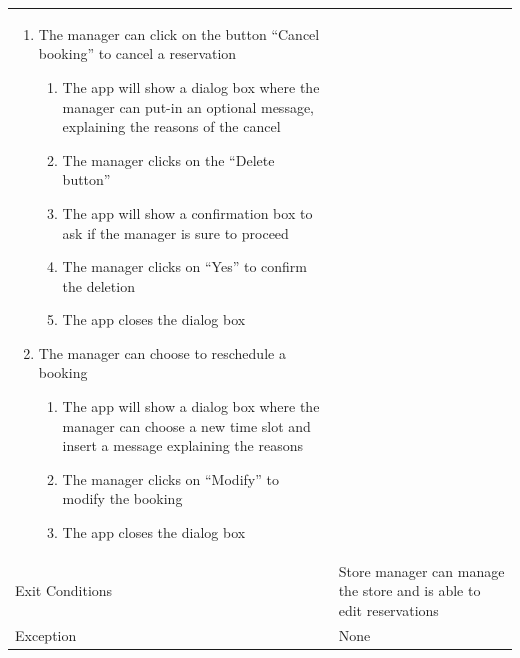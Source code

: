 \documentclass{article}
\newcommand\xrowht[2][0]
{\addstackgap[.5\dimexpr#2\relax]{\vphantom{#1}}}
\begin{document}
\begin{center}
\begin{adjustwidth}{-2.8cm}{}
\begin{tabular}[h!]{|m{7.5em}|m{36em}|}
\begin{enumerate}
\begin{enumerate}
\begin{enumerate}
										
									\end{enumerate}
								
									\item The manager can click on the button “Cancel booking” to cancel a reservation
									
									\begin{enumerate}
										
										\item The app will show a dialog box where the manager can put-in an optional message, explaining the reasons of the cancel
										\item The manager clicks on the “Delete button”
										\item The app will show a confirmation box to ask if the manager is sure to proceed
										\item The manager clicks on “Yes” to confirm the deletion
										\item The app closes the dialog box
										
									\end{enumerate}
								
									\item The manager can choose to reschedule a booking
									
									\begin{enumerate}
										
										\item The app will show a dialog box where the manager can choose a new time slot and insert a message explaining the reasons
										\item The manager clicks on “Modify” to modify the booking
										\item The app closes the dialog box
										
									\end{enumerate}
									
								\end{enumerate}
								
							\end{enumerate}\\
							\xrowht{5pt}
							Exit Conditions & Store manager can manage the store and is able to edit reservations\\
							\xrowht{5pt}
							Exception & None\\	
							\hline
							

\end{tabular}
\end{adjustwidth}
\end{center}
\end{document}
